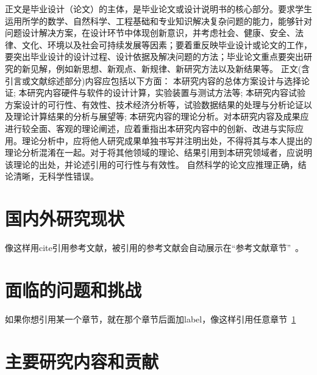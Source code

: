 \documentclass[UTF8,twoside]{ctexrep}
\begin{document}
正文是毕业设计（论文）的主体，是毕业论文或设计说明书的核心部分。要求学生运用所学的数学、自然科学、工程基础和专业知识解决复杂问题的能力，能够针对问题设计解决方案，在设计环节中体现创新意识，并考虑社会、健康、安全、法律、文化、环境以及社会可持续发展等因素；要着重反映毕业设计或论文的工作，要突出毕业设计的设计过程、设计依据及解决问题的方法；毕业论文重点要突出研究的新见解，例如新思想、新观点、新规律、新研究方法以及新结果等。
正文(含引言或文献综述部分)内容应包括以下方面：
本研究内容的总体方案设计与选择论证;
本研究内容硬件与软件的设计计算，实验装置与测试方法等;
本研究内容试验方案设计的可行性、有效性、技术经济分析等，试验数据结果的处理与分析论证以及理论计算结果的分析与展望等;
本研究内容的理论分析。对本研究内容及成果应进行较全面、客观的理论阐述，应着重指出本研究内容中的创新、改进与实际应用。理论分析中，应将他人研究成果单独书写并注明出处，不得将其与本人提出的理论分析混淆在一起。对于将其他领域的理论、结果引用到本研究领域者，应说明该理论的出处，并论述引用的可行性与有效性。
自然科学的论文应推理正确，结论清晰，无科学性错误。


\section{国内外研究现状}\label{sec:demo_sec}
像这样用cite引用参考文献，被引用的参考文献会自动展示在“参考文献章节”~\cite{cduref_book_chen2000,cduref_book_niu2012,cduref_standard_gbt25100,cduref_book_online_lou2011,cduref_journal_desmarais1992,cduref_journal_newspaper_ding2000,cduref_newspaper_ding2000,cduref_newspaper_zhang2000,cduref_conference_china1990,cduref_conference_rosenthall1963,cduref_incollection_standard1988,cduref_incollection_han1985,cduref_incollection_lou2011,cduref_incollection_martin1966,cduref_thesis_zhang1998,cduref_thesis_calms1965,cduref_patent_liu1993,cduref_patent_hebei2001,cduref_patent_koseki2002,cduref_report_usdot1990,cduref_report_who1970,cduref_electronic_jiang1999,cduref_electronic_xiao2001,cduref_electronic_metcalf1995,cduref_electronic_turcotte1992}。

\section{面临的问题和挑战}
如果你想引用某一个章节，就在那个章节后面加label，像这样引用任意章节~\ref{sec:demo_sec}

\section{主要研究内容和贡献}
\end{document}
